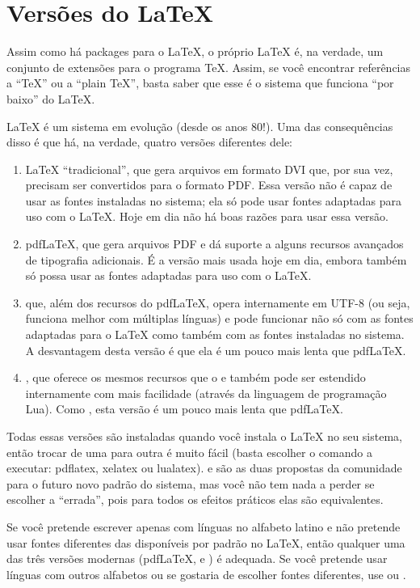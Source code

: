 \section{Versões do \LaTeX{}}

Assim como há packages para o \LaTeX{}, o próprio \LaTeX{} é, na verdade, um
conjunto de extensões para o programa \TeX{}. Assim, se você encontrar
referências a ``\TeX{}'' ou a ``plain \TeX{}'', basta saber que esse é o
sistema que funciona ``por baixo'' do \LaTeX{}.

\LaTeX{} é um sistema em evolução (desde os anos 80!). Uma das consequências
disso é que há, na verdade, quatro versões diferentes dele:

\begin{enumerate}
\item \LaTeX{} ``tradicional'', que gera arquivos em formato DVI que, por
sua vez, precisam ser convertidos para o formato PDF. Essa versão não é
capaz de usar as fontes instaladas no sistema; ela só pode usar fontes
adaptadas para uso com o \LaTeX{}. Hoje em dia não há boas razões para
usar essa versão.

\item pdf\LaTeX{}, que gera arquivos PDF e dá suporte a alguns recursos
avançados de tipografia adicionais. É a versão mais usada hoje em dia,
embora também só possa usar as fontes adaptadas para uso com o \LaTeX{}.

\item \XeLaTeX{} que, além dos recursos do pdf\LaTeX{}, opera internamente
em UTF-8 (ou seja, funciona melhor com múltiplas línguas) e pode funcionar
não só com as fontes adaptadas para o \LaTeX{} como também com as fontes
instaladas no sistema. A desvantagem desta versão é que ela é um pouco
mais lenta que pdf\LaTeX{}.

\item \LuaLaTeX{}, que oferece os mesmos recursos que o \XeLaTeX{} e
também pode ser estendido internamente com mais facilidade (através da
linguagem de programação Lua). Como \XeLaTeX{}, esta versão é um pouco
mais lenta que pdf\LaTeX{}.
\end{enumerate}

Todas essas versões são instaladas quando você instala o \LaTeX{} no seu
sistema, então trocar de uma para outra é muito fácil (basta escolher o
comando a executar: pdflatex, xelatex ou lualatex). \XeLaTeX{} e
\LuaLaTeX{} são as duas propostas da comunidade para o futuro novo padrão
do sistema, mas você não tem nada a perder se escolher a ``errada'', pois
para todos os efeitos práticos elas são equivalentes.

Se você pretende escrever apenas com línguas no alfabeto latino e não
pretende usar fontes diferentes das disponíveis por padrão no \LaTeX{},
então qualquer uma das três versões modernas (pdf\LaTeX{}, \XeLaTeX{}
e \LuaLaTeX{}) é adequada. Se você pretende usar línguas com outros
alfabetos ou se gostaria de escolher fontes diferentes, use \XeLaTeX{}
ou \LuaLaTeX{}.
